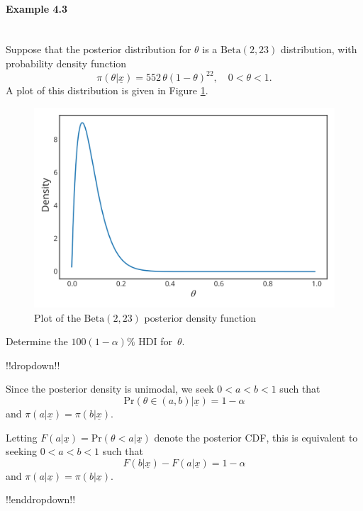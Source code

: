 \paragraph{Example 4.3}{~\\
Suppose that the posterior distribution for $\theta$ is a
\label{ex:hdi}
$\mathrm{Beta}(2,23)$ distribution, with probability density function
$$
\pi(\theta|\underline{x})=552\,\theta(1-\theta)^{22}, \quad 0<\theta<1.
$$
A plot of this distribution is given in Figure \ref{fig:ci2}.
\begin{figure}[h!]

\includegraphics{images/betaposterior2.svg}
\caption{Plot of the $\mathrm{Beta}(2,23)$ posterior density function}
\label{fig:ci2}

\end{figure}
Determine the $100(1-\alpha)\%$ HDI for~$\theta$.

!!dropdown!!

Since the posterior density is unimodal, we seek $ 0 < a < b < 1 $ such that
    $$ \mathrm{Pr}(\theta \in (a,b)|\underline{x}) = 1 - \alpha $$
    and $\pi(a|\underline{x}) = \pi(b|\underline{x})$.
    
    Letting $F(a|\underline{x}) = \mathrm{Pr}(\theta < a|\underline{x})$ denote the posterior CDF, this is equivalent to  seeking $0<a<b<1$ such that
    $$ F(b|\underline{x}) - F(a|\underline{x}) = 1 - \alpha$$
    and $\pi(a|\underline{x}) = \pi(b|\underline{x})$.

!!enddropdown!!
\clearpage

}
